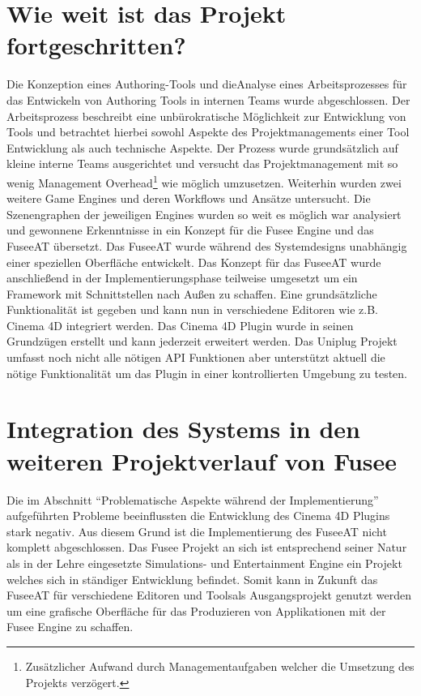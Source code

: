 \documentclass[pagesize, paper=a4, fontsize=12pt, titlepage=true, headings=small, headnosepline, abstractoff, liststotoc, nochapterprefix, plainheadsepline, twoside]{scrreprt}
\begin{document}
\section{Wie weit ist das Projekt fortgeschritten?}
Die Konzeption eines Authoring-Tools und dieAnalyse eines Arbeitsprozesses für das Entwickeln von Authoring Tools in internen Teams wurde abgeschlossen. Der Arbeitsprozess beschreibt eine unbürokratische Möglichkeit zur Entwicklung von Tools und betrachtet hierbei sowohl Aspekte des Projektmanagements einer Tool Entwicklung als auch technische Aspekte. Der Prozess wurde grundsätzlich auf kleine interne Teams ausgerichtet und versucht das Projektmanagement mit so wenig Management Overhead\footnote{Zusätzlicher Aufwand durch Managementaufgaben welcher die Umsetzung des Projekts verzögert.} wie möglich umzusetzen. Weiterhin wurden zwei weitere Game Engines und deren Workflows und Ansätze untersucht. Die Szenengraphen der jeweiligen Engines wurden so weit es möglich war analysiert und gewonnene Erkenntnisse in ein Konzept für die Fusee Engine und das FuseeAT übersetzt. Das FuseeAT wurde während des Systemdesigns unabhängig einer speziellen Oberfläche entwickelt. Das Konzept für das FuseeAT wurde anschließend in der Implementierungsphase teilweise umgesetzt um ein Framework mit Schnittstellen nach Außen zu schaffen. Eine grundsätzliche Funktionalität ist gegeben und kann nun in verschiedene Editoren wie z.B. Cinema 4D integriert werden. Das Cinema 4D Plugin wurde in seinen Grundzügen erstellt und kann jederzeit erweitert werden. Das Uniplug Projekt umfasst noch nicht alle nötigen API Funktionen aber unterstützt aktuell die nötige Funktionalität um das Plugin in einer kontrollierten Umgebung zu testen.

\section{Integration des Systems in den weiteren Projektverlauf von Fusee}
Die im Abschnitt “Problematische Aspekte während der Implementierung” aufgeführten Probleme beeinflussten die Entwicklung des Cinema 4D Plugins stark negativ. Aus diesem Grund ist die Implementierung des FuseeAT nicht komplett abgeschlossen. Das Fusee Projekt an sich ist entsprechend seiner Natur als in der Lehre eingesetzte Simulations- und Entertainment Engine ein Projekt welches sich in ständiger Entwicklung befindet. Somit kann in Zukunft das FuseeAT für verschiedene Editoren und Toolsals Ausgangsprojekt genutzt werden um eine grafische Oberfläche für das Produzieren von Applikationen mit der Fusee Engine zu schaffen.  
\end{document}
